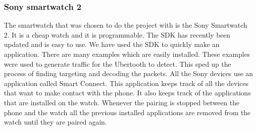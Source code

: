 \subsubsection{Sony smartwatch 2}
\label{subsubsec:sw2}
The smartwatch that was chosen to do the project with is the Sony 
Smartwatch 2. It is a cheap watch and it is programmable. The SDK has recently been updated and is easy to use. We have used the SDK to quickly make an application. There are many examples which are easily installed. These examples were used to generate traffic for the Ubertooth to detect. This sped up the process of finding targeting and decoding the packets. 
All the Sony devices use an application called Smart Connect. This application keeps track of all the devices that want to make contact with the phone. It also keeps track of the applications that are installed on the watch. Whenever the pairing is stopped between the phone and the watch all the previous installed applications are removed from the watch until they are paired again.